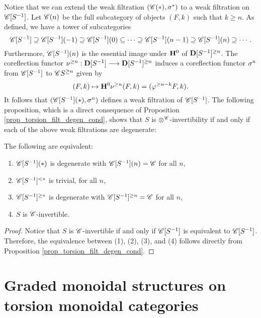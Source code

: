 Notice that we can extend the weak filtration $(\SGFilt{*}{\Cat{C}},
\sgHI{*})$ to a weak filtration on $\CatLoc{C}{S}$. Let 
$\SGFilt{n}{\Cat{C}}$ be the full subcategory of objects $(F, k)$ 
such that $k \geq n$. As defined, we have a tower of subcategories
\[
\CatLoc{C}{S} \supseteq \SGFilt{-1}{\CatLoc{C}{S}} \supseteq 
   \SGFilt{0}{\CatLoc{C}{S}} \subseteq \cdots \supseteq 
   \SGFilt{n - 1}{\CatLoc{C}{S}} 
   \supseteq \SGFilt{n}{\CatLoc{C}{S}} \supseteq \cdots.
\]
Furthermore, $\SGFilt{n}{\CatLoc{C}{S}}$ is the essential image 
under $\HH^0$ of $\Prerad{n}{\DCatLoc{S}}$. The coreflection functor
$\preradD{n}: \DCatLoc{S} \to \Prerad{n}{\DCatLoc{S}}$ induces a
coreflection functor $\sgHI{n}$ from $\CatLoc{C}{S}$ to 
$\Prerad{n}{\Cat{C}{S}}$ given by
\[
(F, k) \mapsto \HH^0\preradD{n}(F, k) = (\prerad{n - k}F, k).
\]
It follows that $(\SGFilt{*}{\CatLoc{C}{S}}, \sgHI{n})$ defines
a weak filtration of $\CatLoc{C}{S}$. The following proposition,
which is a direct consequence of Proposition
\ref{prop_torsion_filt_degen_cond}, shows that $S$ is 
$\tensor^{\Cat{C}}$-invertibility if and only if each of the
above weak filtrations are degenerate:

\begin{prop}
The following are equivalent:

\begin{enumerate}
\item $\SGFilt{*}{\CatLoc{C}{S}}$ is degenerate with 
$\SGFilt{n}{\CatLoc{C}{S}} = \Cat{C}$ for all $n$,

\item $\Corad{*}{\CatLoc{C}{S}}$ is trivial,
for all $n$,

\item $\Prerad{*}{\CatLoc{C}{S}}$ is degenerate with 
$\Prerad{n}{\CatLoc{C}{S}} = \Cat{C}$ for all $n$,

\item $S$ is $\Cat{C}$-invertible.
\end{enumerate}
\end{prop}
\begin{proof}
Notice that $S$ is $\Cat{C}$-invertible if and
only if $\CatLoc{C}{S}$ is equivalent to $\CatLoc{C}{S}$.
Therefore, the equivalence between (1), (2), (3), and (4)
follows directly from Proposition 
\ref{prop_torsion_filt_degen_cond}.
\end{proof}

\section{Graded monoidal structures on torsion monoidal categories}

